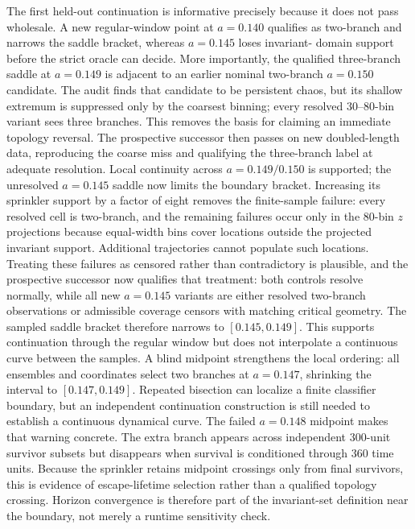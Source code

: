 The first held-out continuation is informative precisely because it does not
pass wholesale.  A new regular-window point at $a=0.140$ qualifies as
two-branch and narrows the saddle bracket, whereas $a=0.145$ loses invariant-
domain support before the strict oracle can decide.  More importantly, the
qualified three-branch saddle at $a=0.149$ is adjacent to an earlier nominal
two-branch $a=0.150$ candidate.  The audit finds that candidate to be persistent
chaos, but its shallow extremum is suppressed only by the coarsest binning;
every resolved 30--80-bin variant sees three branches.  This removes the basis
for claiming an immediate topology reversal.  The prospective successor then
passes on new doubled-length data, reproducing the coarse miss and qualifying
the three-branch label at adequate resolution.  Local continuity across
$a=0.149/0.150$ is supported; the unresolved $a=0.145$ saddle now limits the
boundary bracket.  Increasing its sprinkler support by a factor of eight
removes the finite-sample failure: every resolved cell is two-branch, and the
remaining failures occur only in the 80-bin $z$ projections because equal-width
bins cover locations outside the projected invariant support.  Additional
trajectories cannot populate such locations.  Treating these failures as
censored rather than contradictory is plausible, and the prospective
successor now qualifies that treatment: both controls resolve normally, while
all new $a=0.145$ variants are either resolved two-branch observations or
admissible coverage censors with matching critical geometry.  The sampled
saddle bracket therefore narrows to $[0.145,0.149]$.  This supports continuation
through the regular window but does not interpolate a continuous curve between
the samples.  A blind midpoint strengthens the local ordering: all ensembles
and coordinates select two branches at $a=0.147$, shrinking the interval to
$[0.147,0.149]$.  Repeated bisection can localize a finite classifier boundary,
but an independent continuation construction is still needed to establish a
continuous dynamical curve.  The failed $a=0.148$ midpoint makes that warning
concrete.  The extra branch appears across independent 300-unit survivor
subsets but disappears when survival is conditioned through 360 time units.
Because the sprinkler retains midpoint crossings only from final survivors,
this is evidence of escape-lifetime selection rather than a qualified topology crossing.  Horizon
convergence is therefore part of the invariant-set definition near the
boundary, not merely a runtime sensitivity check.

